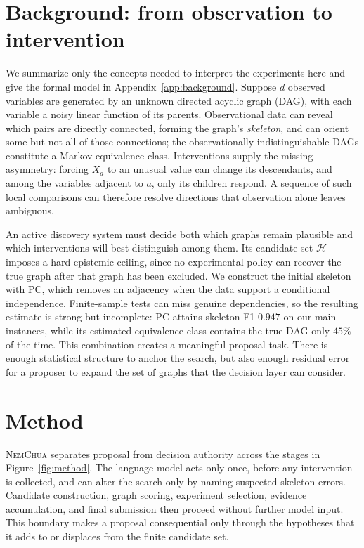 \documentclass{article}
\newcommand{\nem}{\textsc{NemChua}}
\newcommand{\Hyp}{\mathcal{H}}
\begin{document}
\section{Background: from observation to intervention}
\label{sec:background}

We summarize only the concepts needed to interpret the experiments here and give the formal model
in Appendix~\ref{app:background}. Suppose $d$ observed variables are generated by an unknown
directed acyclic graph (DAG), with each variable a noisy linear function of its parents.
Observational data can reveal which pairs are directly connected, forming the graph's
\emph{skeleton}, and can orient some but not all of those connections; the observationally
indistinguishable DAGs constitute a Markov equivalence class. Interventions supply the missing
asymmetry: forcing $X_a$ to an unusual value can change its descendants, and among the variables
adjacent to $a$, only its children respond. A sequence of such local comparisons can therefore
resolve directions that observation alone leaves ambiguous.

An active discovery system must decide both which graphs remain plausible and which interventions
will best distinguish among them. Its candidate set $\Hyp$ imposes a hard epistemic ceiling, since
no experimental policy can recover the true graph after that graph has been excluded. We construct
the initial skeleton with PC, which removes an adjacency when the data support a conditional
independence. Finite-sample tests can miss genuine dependencies, so the resulting estimate is strong
but incomplete: PC attains skeleton F1 $0.947$ on our main instances, while its estimated equivalence
class contains the true DAG only $45\%$ of the time. This combination creates a meaningful proposal
task. There is enough statistical structure to anchor the search, but also enough residual error for
a proposer to expand the set of graphs that the decision layer can consider.

\section{Method}
\label{sec:method}

\nem{} separates proposal from decision authority across the stages in Figure~\ref{fig:method}. The
language model acts only once, before any intervention is collected, and can alter the search only by
naming suspected skeleton errors. Candidate construction, graph scoring, experiment selection,
evidence accumulation, and final submission then proceed without further model input. This boundary
makes a proposal consequential only through the hypotheses that it adds to or displaces from the
finite candidate set.
\end{document}
